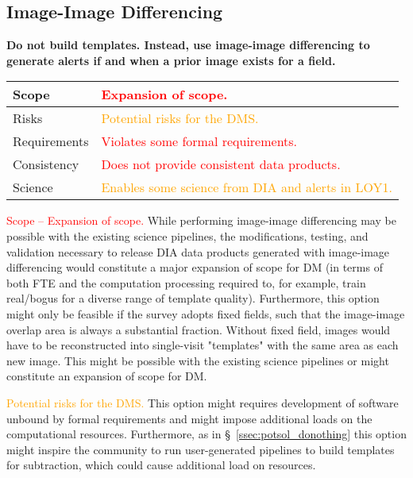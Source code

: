 \documentclass[DM,lsstdraft,toc]{lsstdoc}
\begin{document}
\clearpage
\subsection{Image-Image Differencing}\label{ssec:potsol_imgimg}

{\bf Do not build templates. Instead, use image-image differencing to generate alerts if and when a prior image exists for a field.}

\begin{center}
\begin{tabular}{|p{2.5cm}|p{13cm}|}
\hline
Scope & \textcolor{red}{Expansion of scope.} \\
\hline
Risks & \textcolor{orange}{Potential risks for the DMS.} \\
\hline
Requirements & \textcolor{red}{Violates some formal requirements.} \\
\hline
Consistency & \textcolor{red}{Does not provide consistent data products.} \\
\hline
Science & \textcolor{orange}{Enables some science from DIA and alerts in LOY1.} \\
\hline
\end{tabular}
\end{center}

\textcolor{red}{ Scope -- Expansion of scope.}
While performing image-image differencing may be possible with the existing science pipelines, the modifications, testing, and validation necessary to release DIA data products generated with image-image differencing would constitute a major expansion of scope for DM (in terms of both FTE and the computation processing required to, for example, train real/bogus for a diverse range of template quality).
Furthermore, this option might only be feasible if the survey adopts fixed fields, such that the image-image overlap area is always a substantial fraction.
Without fixed field, images would have to be reconstructed into single-visit "templates" with the same area as each new image.
This might be possible with the existing science pipelines or might constitute an expansion of scope for DM.

\textcolor{orange}{ Potential risks for the DMS.}
This option might requires development of software unbound by formal requirements and might impose additional loads on the computational resources.
Furthermore, as in \S~\ref{ssec:potsol_donothing} this option might inspire the community to run user-generated pipelines to build templates for subtraction, which could cause additional load on resources.
\end{document}
